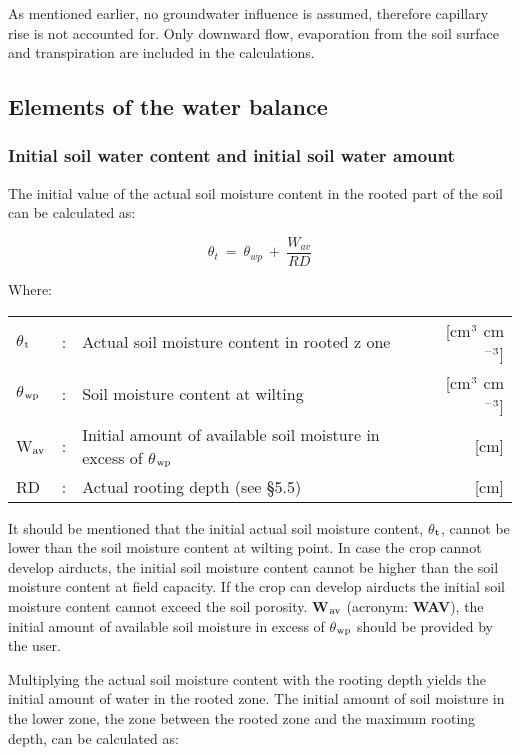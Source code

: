 As mentioned earlier, no groundwater influence is assumed, therefore capillary rise is not
accounted for. Only downward flow, evaporation from the soil surface and transpiration
are included in the calcula\-tions. 

\subsection{Elements of the water balance  }


\subsubsection{Initial soil water content and initial soil water amount}

The initial value of the actual soil moisture content in the rooted part of the soil can be
calculated as:

\begin{equation}
\theta_{t} ~ =~\theta_{wp} ~+~{\frac{W_{av}}{RD}}
\end{equation}

Where:\\[5pt]
\begin{tabularx}{\textwidth}{llXr}
$\theta$$_{{\rm t}}$ &:& Actual soil moisture content in rooted z
    one  & [cm$^{{\rm 3}}$ cm$^{{\rm -3}}$]\\
$\theta$$_{{\rm wp}}$ &:& Soil moisture content at wilting   & [cm$^{{\rm 3}}$ cm$^{{\rm -3}}$]\\
W$_{{\rm av}}$ &:& Initial amount of available soil moisture 
    in excess of $\theta$$_{{\rm wp}}$ & [cm]\\
RD &:& Actual rooting depth (see \S 5.5) & [cm]\\
\end{tabularx}

It should be mentioned that the initial actual soil moisture content, $\theta$$_{{\rm t}}$, cannot be lower
than the soil moisture content at wilting point. In case the crop cannot develop airducts,
the initial soil moisture content cannot be higher than the soil moisture content at field
capacity. If the crop can develop airducts the initial soil moisture content cannot exceed
the soil porosity. {\bf W$_{{\rm av}}$} (acronym: {\bf WAV}), the initial amount of available soil moisture in
excess of $\theta$$_{{\rm wp}}$ should be provided by the user. 

Multiplying the actual soil moisture content with the rooting depth yields the initial
amount of water in the rooted zone. The initial amount of soil moisture in the lower zone,
the zone between the rooted zone and the maximum rooting depth, can be calculated as:

